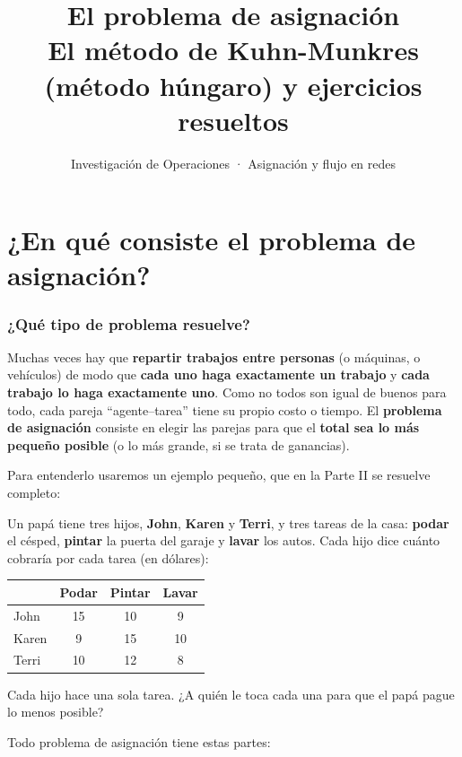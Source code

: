 \documentclass[11pt,a4paper]{article}
\title{\textbf{El problema de asignación}\\[4pt]\large El método de Kuhn-Munkres (método húngaro) y ejercicios resueltos}
\author{Investigación de Operaciones · Asignación y flujo en redes}
\date{}
\begin{document}
\maketitle
\tableofcontents
\newpage

\part{¿En qué consiste el problema de asignación?}

\section{¿Qué tipo de problema resuelve?}

Muchas veces hay que \textbf{repartir trabajos entre personas} (o máquinas, o vehículos) de modo que
\textbf{cada uno haga exactamente un trabajo} y \textbf{cada trabajo lo haga exactamente uno}. Como no todos
son igual de buenos para todo, cada pareja ``agente--tarea'' tiene su propio costo o tiempo. El
\textbf{problema de asignación} consiste en elegir las parejas para que el \textbf{total sea lo más pequeño posible}
(o lo más grande, si se trata de ganancias).

Para entenderlo usaremos un ejemplo pequeño, que en la Parte II se resuelve completo:

\begin{ojo}
Un papá tiene tres hijos, \textbf{John}, \textbf{Karen} y \textbf{Terri}, y tres tareas de la casa:
\textbf{podar} el césped, \textbf{pintar} la puerta del garaje y \textbf{lavar} los autos. Cada hijo dice cuánto
cobraría por cada tarea (en dólares):
\begin{center}\small
\begin{tabular}{lccc}
 & Podar & Pintar & Lavar \\
\midrule
John  & 15 & 10 & 9 \\
Karen & 9  & 15 & 10 \\
Terri & 10 & 12 & 8 \\
\end{tabular}
\end{center}
Cada hijo hace una sola tarea. ¿A quién le toca cada una para que el papá pague lo menos posible?
\end{ojo}

Todo problema de asignación tiene estas partes:
\end{document}
